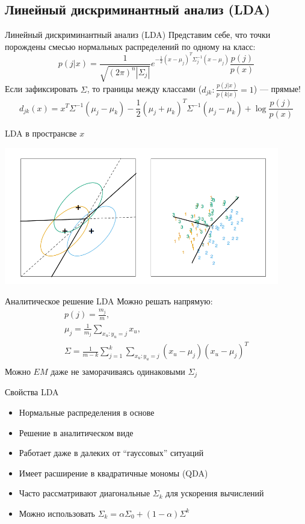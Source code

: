 \documentclass[14pt, fleqn, xcolor={dvipsnames, table}]{beamer}
\begin{document}
\subsection{Линейный дискриминантный анализ (LDA)}
\begin{frame}{Линейный дискриминантный анализ (LDA)}
Представим себе, что точки порождены смесью нормальных распределений по одному на класс:
$$
p(j|x) = \frac{1}{\sqrt{(2\pi)^n|\Sigma_j|}}e^{-\frac{1}{2}(x - \mu_j)^T\Sigma^{-1}_j(x - \mu_j)} \frac{p(j)}{p(x)}
$$
Если зафиксировать $\Sigma$, то границы между классами ($d_{jk} : \frac{p(j|x)}{p(k|x)} = 1$) --- прямые!
\small
$$
d_{jk}(x) = x^T\Sigma^{-1}(\mu_j - \mu_k) - \frac{1}{2}(\mu_j + \mu_k)^T\Sigma^{-1}(\mu_j - \mu_k) + \log\frac{p(j)}{p(x)}
$$
\end{frame}

\begin{frame}{LDA в пространсве $x$}
\begin{center}
\includegraphics[width=0.9\textwidth]{4_5.png}
\end{center}
\end{frame}

\begin{frame}{Аналитическое решение LDA}
Можно решать напрямую:
$$\begin{array}{c}
p(j) = \frac{m_j}{m},\\
\mu_j = \frac{1}{m_j}\sum_{x_u:y_u = j} x_u,\\
\Sigma = \frac{1}{m-k}\sum_{j=1}^k\sum_{x_u:y_u = j}(x_u - \mu_j)(x_u - \mu_j)^T \\
\end{array}$$
Можно $EM$ даже не заморачиваясь одинаковыми $\Sigma_j$
\end{frame}
\begin{frame}{Свойства LDA}
\begin{itemize}
  \item Нормальные распределения в основе
  \item Решение в аналитическом виде
  \item Работает даже в далеких от ``гауссовых'' ситуаций
  \item Имеет расширение в квадратичные мономы (QDA)
  \item Часто рассматривают диагональные $\Sigma_k$ для ускорения вычислений
  \item Можно использовать $\Sigma_k = \alpha\Sigma_0 + (1 - \alpha)\Sigma^k$
\end{itemize}
\end{frame}
\end{document}
